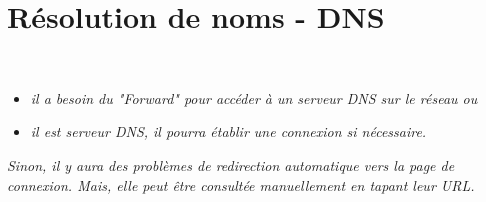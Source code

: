 \section{Résolution de noms - DNS}

\\    
          \begin{itemize}
                \item \emph{il a besoin du "Forward" pour accéder à un serveur DNS sur le réseau ou}
                \item \emph{il est serveur DNS, il pourra établir une connexion si nécessaire.}
          \end{itemize}

               \emph{Sinon, il y aura des problèmes de redirection automatique vers la page de connexion.
                   Mais, elle peut être consultée manuellement en tapant leur URL.}

